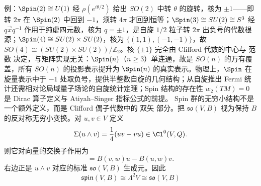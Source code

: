 例：$\Spin(2)\cong U(1)$ 经 $\rho(e^{i\theta/2})$ 给出 $SO(2)$ 中转 $\theta$ 的旋转，核为 $\pm1$——即转 $2\pi$ 在 $\Spin(2)$ 中回到 $-1$，须转 $4\pi$ 才回到恒等；$\Spin(3)\cong SU(2)\cong S^3$ 经 $q\vec xq^{-1}$ 作用于纯虚四元数，核为 $q=\pm1$，是自旋 $1/2$ 粒子转 $2\pi$ 出负号的代数根源；$\Spin(4)\cong SU(2)\times SU(2)$，核为 $\{(1,1),(-1,-1)\}$，故 $SO(4)\cong(SU(2)\times SU(2))/\mathbb Z_2$。核 $\{\pm1\}$ 完全由 Clifford 代数的中心与 范数 决定，与矩阵实现无关：$\Spin(n)$（$n\ge3$）单连通，故是 $SO(n)$ 的万有覆盖，所有 $SO(n)$ 的投影表示提升为 $\Spin(n)$ 的真实表示。物理上，$\Spin$ 在旋量表示中于 $-1$ 处取负号，提供半整数自旋的几何结构；从自旋推出 Fermi 统计还需相对论局域量子场论的自旋统计定理；Spin 结构的存在性 $w_2(TM)=0$ 是 Dirac 算子定义与 Atiyah--Singer 指标公式的前提。
Spin 群的无穷小结构不是一个额外定义，而是 Clifford 偶子代数中的 双矢 部分。把 $\mathfrak{so}(V,B)$ 视为保持 $B$ 的反对称无穷小变换。对 $u,v\in V$ 定义
\begin{equation*}\Sigma(u\wedge v)
=\frac14(uv-vu)\in\Cl^0(V,Q).\end{equation*}
则它对向量的交换子作用为
\begin{equation}
[\Sigma(u\wedge v),w]
=B(v,w)u-B(u,w)v.
\label{eq:spin-bivector-so-action}
\end{equation}
右边正是 $u\wedge v$ 对应的标准 $\mathfrak{so}(V,B)$ 生成元。因此
\begin{equation}
\mathfrak{spin}(V,B)
\cong\Lambda^2V
\cong\mathfrak{so}(V,B)
\label{eq:spin-lie-algebra-isomorphism}
\end{equation}

